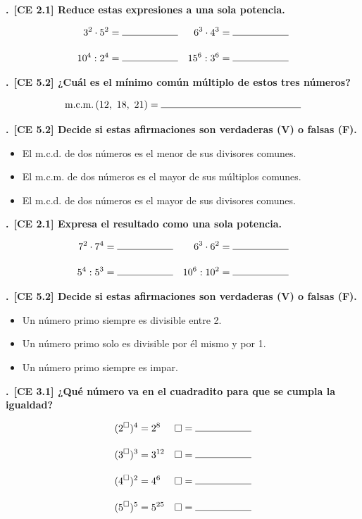 \documentclass[12pt,a4paper,twoside]{article}
\newcounter{ej}
\newcommand{\ejercicio}[1]{\stepcounter{ej}\par\medskip\noindent\textbf{\theej.}\ \textbf{#1}\par\smallskip}
\newcommand{\hueco}[1][2cm]{\rule{#1}{0.4pt}}
\begin{document}
\ejercicio{[CE 2.1] Reduce estas expresiones a una sola potencia.}
\begin{align*}
3^2 \cdot 5^2 &= \hueco & 6^3 \cdot 4^3 &= \hueco \\[10pt]
10^4 : 2^4 &= \hueco & 15^6 : 3^6 &= \hueco
\end{align*}

\ejercicio{[CE 5.2] ¿Cuál es el mínimo común múltiplo de estos tres números?}
\[
\text{m.c.m.}\,(12,\ 18,\ 21) = \hueco[5cm]
\]

\ejercicio{[CE 5.2] Decide si estas afirmaciones son verdaderas (V) o falsas (F).}
\begin{itemize}\setlength{\itemsep}{6pt}
    \item El m.c.d. de dos números es el menor de sus divisores comunes. 
    \item El m.c.m. de dos números es el mayor de sus múltiplos comunes. 
    \item El m.c.d. de dos números es el mayor de sus divisores comunes. 
\end{itemize}

\ejercicio{[CE 2.1] Expresa el resultado como una sola potencia.}
\begin{align*}
7^2 \cdot 7^4 &= \hueco & 6^3 \cdot 6^2 &= \hueco \\[10pt]
5^4 : 5^3 &= \hueco & 10^6 : 10^2 &= \hueco
\end{align*}



\ejercicio{[CE 5.2] Decide si estas afirmaciones son verdaderas (V) o falsas (F).}
\begin{itemize}\setlength{\itemsep}{6pt}
    \item Un número primo siempre es divisible entre 2.
    \item Un número primo solo es divisible por él mismo y por 1. 
    \item Un número primo siempre es impar. 
\end{itemize}

\newpage

\ejercicio{[CE 3.1] ¿Qué número va en el cuadradito para que se cumpla la igualdad?}
\begin{align*}
(2^{\square})^4 &= 2^8 & \square &= \hueco[2cm] \\[10pt]
(3^{\square})^3 &= 3^{12} & \square &= \hueco[2cm] \\[10pt]
(4^{\square})^2 &= 4^6 & \square &= \hueco[2cm] \\[10pt]
(5^{\square})^5 &= 5^{25} & \square &= \hueco[2cm]
\end{align*}
\end{document}
